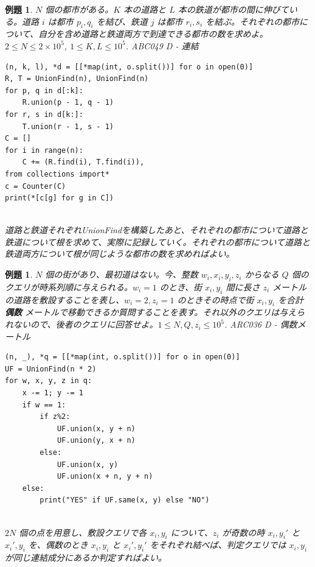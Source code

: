 \documentclass[12pt, a4j]{ltjsarticle}
\newtheorem{exm}[thm]{例題}
\newcommand*{\SS}{\vspace{1cm}}
\begin{document}
\SS

\begin{exm} $N$ 個の都市がある。$K$ 本の道路と $L$ 本の鉄道が都市の間に伸びている。道路 $i$ は都市 $p_i,q_i$ を結び、鉄道 $j$ は都市 $r_i,s_i$ を結ぶ。それぞれの都市について、自分を含め道路と鉄道両方で到達できる都市の数を求めよ。$2\le N \le 2\times 10^5$, $1\le K,L\le 10^5$. \upshape\quad ABC049 D - 連結\\
\begin{lstlisting}
(n, k, l), *d = [[*map(int, o.split())] for o in open(0)]
R, T = UnionFind(n), UnionFind(n)
for p, q in d[:k]:
    R.union(p - 1, q - 1)
for r, s in d[k:]:
    T.union(r - 1, s - 1)
C = []
for i in range(n):
    C += (R.find(i), T.find(i)),
from collections import*
c = Counter(C)
print(*[c[g] for g in C])
\end{lstlisting}\quad\\
道路と鉄道それぞれUnionFindを構築したあと、それぞれの都市について道路と鉄道について根を求めて、実際に記録していく。それぞれの都市について道路と鉄道両方について根が同じような都市の数を求めればよい。
\end{exm}

\SS

\begin{exm} $N$ 個の街があり、最初道はない。今、整数 $w_i,x_i,y_i,z_i$ からなる $Q$ 個のクエリが時系列順に与えられる。$w_i = 1$ のとき、街 $x_i,y_i$ 間に長さ $z_i$ メートルの道路を敷設することを表し、$w_i = 2, z_i = 1$ のときその時点で街 $x_i,y_i$ を合計 {\bf 偶数} メートルで移動できるか質問することを表す。それ以外のクエリは与えられないので、後者のクエリに回答せよ。$1\le N,Q,z_i\le 10^5$. \upshape\quad ARC036 D - 偶数メートル\\
\begin{lstlisting}
(n, _), *q = [[*map(int, o.split())] for o in open(0)]
UF = UnionFind(n * 2)
for w, x, y, z in q:
    x -= 1; y -= 1
    if w == 1:
        if z%2:
            UF.union(x, y + n)
            UF.union(y, x + n)
        else:
            UF.union(x, y)
            UF.union(x + n, y + n)
    else:
        print("YES" if UF.same(x, y) else "NO")
\end{lstlisting}\quad\\
$2N$ 個の点を用意し、敷設クエリで各 $x_i,y_i$ について、$z_i$ が奇数の時 $x_i,y_i'$ と $x_i',y_i$ を、偶数のとき $x_i,y_i$ と $x_i',y_i'$ をそれぞれ結べば、判定クエリでは $x_i,y_i$ が同じ連結成分にあるか判定すればよい。
\end{exm}
\end{document}
